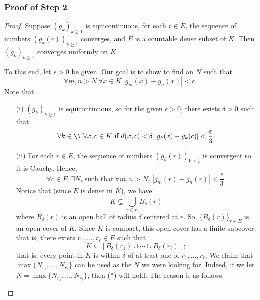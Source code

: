 \subsubsection{Proof of Step 2}

\begin{proof}
    Suppose \( ({g}_{k})_{k \geq 1} \) is equicontinuous, for each \( r \in E  \), the sequence of numbers \( ({g}_{k }(r)) _{k \geq 1}\) converges, and \( E  \) is a countable dense subset of \(  K  \). Then \( ({g}_{k})_{k \geq 1} \) converges uniformly on \( K  \).  
    
    To this end, let \( \epsilon > 0 \) be given. Our goal is to show to find an \( N  \) such that 
    \[  \forall m,n > N \ \forall x \in K \ | {g}_{m}(x) - {g}_{n}(x)  | < \epsilon. \tag{*} \]
    Note that 
    \begin{enumerate}
        \item[(i)] \( ({g}_{k})_{k \geq 1} \) is equicontinuous, so for the given \( \epsilon > 0  \), there exists \( \delta > 0  \) such that 
            \[  \forall k \in \N \ \forall x,c \in K \ \text{if} \ d(x,c) < \delta \ | {g}_{k}(x) - {g}_{k }(c)  | < \frac{ \epsilon }{ 3 }. \]
        \item[(ii)] For each \( r \in E  \), the sequence of numbers \( ({g}_{k } (r))_{k \geq 1} \) is convergent so it is Cauchy. Hence, 
            \[  \forall c \in E  \ \ \exists {N}_{r} \ \text{such that} \ \forall m,n > {N}_{r} \ | {g}_{m}(r) - {g}_{n}(r) | < \frac{ \epsilon }{ 3 }. \]
            Notice that (since \( E  \) is dense in \(  K \)), we have
            \[  K \subseteq  \bigcup_{ r \in E  }^{  }  {B}_{\delta}(r) \]
            where \( {B}_{\delta}(r) \) is an open ball of radius \( \delta  \) centered at \( r  \). So, \( \{ {B}_{\delta}(r) \}_{r \in E } \) is an open cover of \( K  \). Since \( K  \) is compact, this open cover has a finite subcover, that is, there exists \( {r}_{1}, \dots, {r}_{\ell} \in E  \) such that  
            \[  K \subseteq  [{B}_{\delta}({r}_{1}) \cup \cdots \cup {B}_{\delta}({r}_{\ell})]; \]
            that is, every point in \( K  \) is within \( \delta  \) of at least one of \( {r}_{1}, \dots, {r}_{\ell} \). We claim that \( \max \{ {N}_{{r}_{1}} , \dots, {N}_{{r}_{\ell}} \}  \) can be used as the \( N  \) we were looking for. Indeed, if we let \( N = \max \{  {N}_{{r}_{1}}, \dots, {N}_{{r}_{\ell}} \}  \), then (*) will hold. The reason is as follows:


\end{enumerate}
\end{proof}
